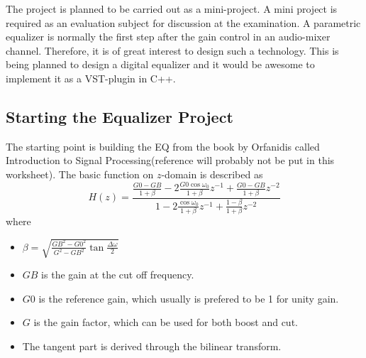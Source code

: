 The project is planned to be carried out as a mini-project.
A mini project is required as an evaluation subject for discussion at the examination.
A parametric equalizer is normally the first step after the gain control in an audio-mixer channel.
Therefore, it is of great interest to design such a technology.
This is being planned to design a digital equalizer and it would be awesome to implement it as a VST-plugin in C++.
\subsection{Starting the Equalizer Project}
The starting point is building the EQ from the book by Orfanidis called Introduction to Signal Processing(reference will probably not be put in this worksheet).
The basic function on $z$-domain is described as
\begin{equation}
    H(z) = \frac{ \frac{G0-GB}{1+\beta} -2 \frac{G0\cos{\omega_0} }{1+\beta} z^{-1} + \frac{G0-GB}{1+\beta}z^{-2}} { 1 - 2\frac{\cos{\omega_0}}{1+\beta}z^{-1} + \frac{1-\beta}{1+\beta}z^{-2}  }
\end{equation}
where
\begin{itemize}
\item $\beta = \sqrt{\frac{GB^2-G0^2}{G^2-GB^2}\tan{\frac{\Delta\omega}{2}}}$
\item $GB$ is the gain at the cut off frequency.
\item $G0$ is the reference gain, which usually is prefered to be 1 for unity gain.
\item $G$ is the gain factor, which can be used for both boost and cut.
\item The tangent part is derived through the bilinear transform.
\end{itemize}
\label{task:20140925_jm0}

